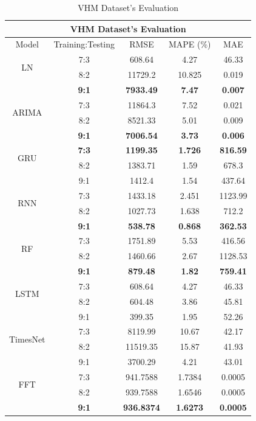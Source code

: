 \documentclass{ieeeojies}
\begin{document}
  \begin{table}[H]
    \centering
    \begin{tabular}{|c|c|c|c|c|}
           \hline
           \multicolumn{5}{|c|}{\textbf{VHM Dataset's Evaluation}}\\
           \hline
           \centering Model & Training:Testing & RMSE & MAPE (\%) & MAE\\
           \hline
           \multirow{2}{*}{LN} & 7:3 & 608.64 & 4.27 & 46.33 \\ & 8:2 & 11729.2 & 10.825 & 0.019 \\ & \textbf{9:1} & \textbf{7933.49} & \textbf{7.47} & \textbf{0.007}\\
           \hline
           \multirow{2}{*}{ARIMA} & 7:3&11864.3&7.52&0.021\\ & 8:2&8521.33&5.01&0.009 \\ & \textbf{9:1} & \textbf{7006.54} & \textbf{3.73} & \textbf{0.006}\\
           \hline
           \multirow{2}{*}{GRU} & \textbf{7:3} & \textbf{1199.35} & \textbf{1.726} & \textbf{816.59} \\ & 8:2 &  1383.71 & 1.59 &678.3 \\ & 9:1 & 1412.4	&1.54&437.64\\
           \hline
           \multirow{2}{*}{RNN} & 7:3 &  1433.18 &  2.451 & 1123.99 \\ & 8:2 &  1027.73 & 1.638 &  712.2\\ & \textbf{9:1} & \textbf{538.78} & \textbf{0.868} & \textbf{362.53} \\
           \hline
           \multirow{2}{*}{RF} & 7:3	& 1751.89 & 5.53 &  416.56 \\ & 8:2 & 1460.66 & 2.67 & 1128.53 \\ & \textbf{9:1} & \textbf{879.48} & \textbf{1.82} & \textbf{759.41}\\
           \hline
           \multirow{2}{*}{LSTM} & 7:3 & 608.64 & 4.27 & 46.33 \\ & 8:2 & 604.48 & 3.86 & 45.81 \\ & 9:1 & 399.35	&1.95&52.26\\
           \hline
           \multirow{2}{*}{TimesNet} & 7:3 & 8119.99 & 10.67 & 42.17 \\ & 8:2 & 11519.35 & 15.87 & 41.93 \\ & 9:1 & 3700.29	& 4.21 &43.01\\
           \hline
           \multirow{2}{*}{FFT} & 7:3 & 941.7588 &  1.7384 &  0.0005 \\ & 8:2 & 939.7588 &  1.6546 &  0.0005 \\ & \textbf{9:1} & \textbf{936.8374} & \textbf{1.6273} & \textbf{0.0005}\\
           \hline
      \end{tabular}
      \caption{VHM Dataset's Evaluation}
      \label{vcbresult}
  \end{table}
\end{document}
